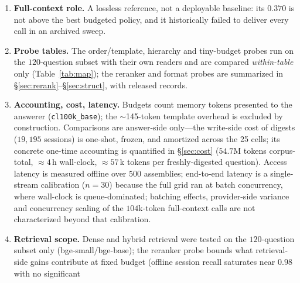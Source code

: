 \documentclass{article} %
\begin{document}
\begin{enumerate}
\S\ref{sec:judge}), not on the primary reader's full $500$-question grid. Strict and relaxed EM agree at $512$--$2048$ but diverge at $4096$ (\S\ref{sec:frontier}),
so every paired test is reported under both metrics (Table~\ref{tab:stats}) and the divergence
is disclosed rather than resolved by picking a metric. Bootstrap CIs and McNemar tests quantify run-level uncertainty but not judge-version
drift; a response-period probe shows the strict copy-exact-phrase template itself costs a
few points, cancelling in all within-template comparisons (Supplement). The
``best guess'' clause is likewise bounded: $85$--$91\%$ of correct answers are verbatim
substrings of the injected context, guess preambles occur on $2.5\%$ of questions, and
guess-preamble hits are $0.7\%$ of correct answers---too few to move any ranking.
\item \textbf{Full-context role.} A lossless reference, not a deployable baseline: its
$0.370$ is not above the best budgeted policy, and it historically failed to deliver every
call in an archived sweep.
\item \textbf{Probe tables.} The order/template, hierarchy and tiny-budget probes run on the
$120$-question subset with their own readers and are compared \emph{within-table} only
(Table~\ref{tab:map}); the reranker and format probes are summarized in
\S\ref{sec:rerank}--\S\ref{sec:struct}, with released records.
\item \textbf{Accounting, cost, latency.} Budgets count memory tokens presented to the
answerer (\texttt{cl100k\_base}); the $\sim$145-token template overhead is excluded by
construction. Comparisons are answer-side only---the write-side cost of digests
($19{,}195$ sessions) is one-shot, frozen, and amortized across the 25 cells; its concrete
one-time accounting is quantified in \S\ref{sec:cost} ($54.7$M tokens corpus-total,
$\approx 4$\,h wall-clock, $\approx 57$\,k tokens per freshly-digested question). Access latency
is measured offline over $500$ assemblies; end-to-end latency is a single-stream calibration
($n{=}30$) because the full grid ran at batch concurrency, where wall-clock is
queue-dominated; batching effects, provider-side variance and concurrency scaling of the
$104$k-token full-context calls are not characterized beyond that calibration.
\item \textbf{Retrieval scope.} Dense and hybrid retrieval were tested on the $120$-question
subset only (bge-small/bge-base); the reranker probe bounds what retrieval-side gains
contribute at fixed budget (offline session recall saturates near $0.98$ with no significant

\end{enumerate}
\end{document}
